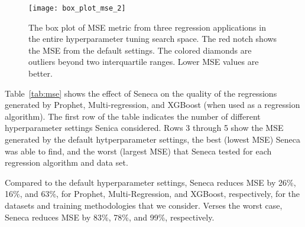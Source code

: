 \begin{figure}[t] \centering 
\texttt{[image: box\_plot\_mse\_2]}
\caption{The box plot of MSE metric from three regression applications in the entire hyperparameter tuning search space. The red notch shows the MSE from the default settings. The colored diamonds are outliers beyond two interquartile ranges. Lower MSE values are better.
\label{fig:box_plot_mse}}
\end{figure}

Table~\ref{tab:mse} shows the effect of Seneca on the quality of the
regressions generated by Prophet, Multi-regression, and XGBoost (when used as
a regression algorithm). The first row of the table indicates the number of
different hyperparameter settings Senica considered.  Rows 3 through 5 show
the MSE generated by the default hytperparameter settings, the best (lowest
MSE) Seneca was able to find, and the worst (largest MSE) that Seneca tested
for each regression algorithm and data set.

%

Compared to the default hyperparameter settings,
Seneca reduces MSE by 26\%, 16\%, and 63\%, for Prophet, Multi-Regression, and XGBoost,
respectively, for the datasets and training methodologies that we consider.
Verses the worst case, Seneca reduces MSE by 83\%, 78\%, and 99\%, respectively.

